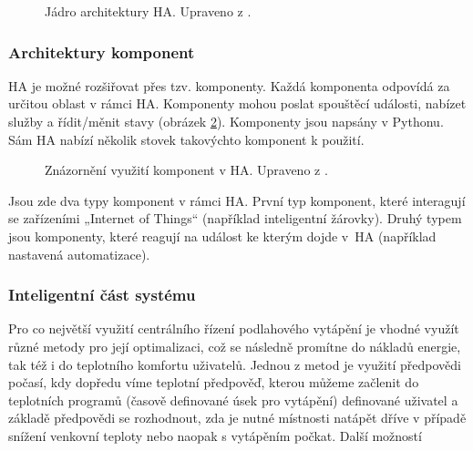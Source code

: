 \begin{figure}[H]
    \centering
    \def\svgwidth{\columnwidth}
    
    \caption[Jádro architektury HA.]{Jádro architektury HA. Upraveno z \cite{home-assistant-architektura}.}
    \label{fig:ha-jadro-architektury}
\end{figure}

\subsubsection{Architektury komponent}
HA je možné rozšiřovat přes tzv. komponenty. Každá komponenta odpovídá za určitou oblast v rámci HA. Komponenty mohou poslat spouštěcí události, nabízet služby a řídit/měnit stavy (obrázek \ref{fig:ha-architektura-komponent}). Komponenty jsou napsány v Pythonu. Sám HA nabízí několik stovek takovýchto komponent k použití.

\begin{figure}[H]
    \centering
    \def\svgwidth{\columnwidth}
    
    \caption[Znázornění využití komponent v HA.]{Znázornění využití komponent v HA. Upraveno z \cite{home-assistant-architektura}.}
    \label{fig:ha-architektura-komponent}
\end{figure}

Jsou zde dva typy komponent v rámci HA. První typ komponent, které interagují se zařízeními „Internet of Things“ (například inteligentní žárovky). Druhý typem jsou komponenty, které reagují na událost ke kterým dojde v~HA (například nastavená automatizace).


\subsubsection{Inteligentní část systému}
Pro co největší využití centrálního řízení podlahového vytápění je vhodné využít různé metody pro její optimalizaci, což se následně promítne do nákladů energie, tak též i do teplotního komfortu uživatelů. Jednou z metod je využití předpovědi počasí, kdy dopředu víme teplotní předpověď, kterou můžeme začlenit do teplotních programů (časově definované úsek pro vytápění) definované uživatel a základě  předpovědi se rozhodnout, zda je nutné místnosti natápět dříve v případě snížení venkovní teploty nebo naopak s vytápěním počkat. Další možností 

